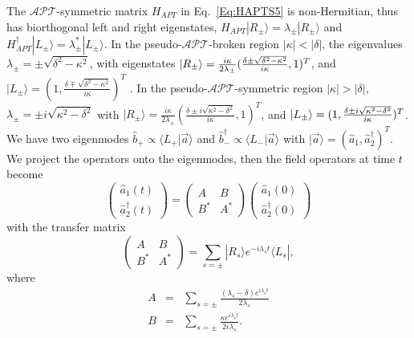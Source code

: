 \documentclass[twocolumn,prl,floatfix,citeautoscript,nofootinbib,superscriptaddress]{revtex4}
\begin{document}
\begin{widetext}
The $\mathcal{APT}$-symmetric matrix $H_{APT}$ in Eq.~\ref{Eq:HAPTS5} is
non-Hermitian, thus has biorthogonal left and right eigenstates, $%
H_{APT}|R_{\pm }\rangle =\lambda _{\pm }|R_{\pm }\rangle $ and $%
H_{APT}^{\dag }|L_{\pm }\rangle =\lambda _{\pm }^{\ast }|L_{\pm }\rangle $.
In the pseudo-$\mathcal{APT}$-broken region $|\kappa |<|\delta |$, the
eigenvalues $\lambda _{\pm }=\pm \sqrt{\delta ^{2}-\kappa ^{2}}$, with
eigenstates $|R_{\pm }\rangle =\frac{i\kappa }{2\lambda _{\pm }}(\frac{%
\delta \pm \sqrt{\delta ^{2}-\kappa ^{2}}}{i\kappa },1)^{T}$, and $|L_{\pm
}\rangle =(1,\frac{\delta \mp \sqrt{\delta ^{2}-\kappa ^{2}}}{i\kappa })^{T}$%
. In the pseudo-$\mathcal{APT}$-symmetric region $|\kappa |>|\delta |$, $%
\lambda _{\pm }=\pm i\sqrt{\kappa ^{2}-\delta ^{2}}$ with $|R_{\pm }\rangle =%
\frac{i\kappa }{2\lambda _{\pm }}(\frac{\delta \pm i\sqrt{\kappa ^{2}-\delta
^{2}}}{i\kappa },1)^{T}$, and $|L_{\pm }\rangle =(1,\frac{\delta \pm i\sqrt{%
\kappa ^{2}-\delta ^{2}}}{i\kappa })^{T} $. We have two eigenmodes $\hat{b}%
_{+}\propto \langle L_{+}|\vec{a}\rangle $ and $\hat{b}_{-}^{\dag }\propto
\langle L_{-}|\vec{a}\rangle $ with $|\vec{a}\rangle =(\hat{a}_{1},\hat{a}%
_{2}^{\dag })^{T}$. We project the operators onto the eigenmodes, then the
field operators at time $t$ become
\begin{equation}
\left(
\begin{array}{c}
\hat{a}_{1}(t) \\
\hat{a}_{2}^{\dag }(t)%
\end{array}%
\right) =\left(
\begin{array}{cc}
A & B \\
B^{\ast } & A^{\ast }%
\end{array}%
\right) \left(
\begin{array}{c}
\hat{a}_{1}(0) \\
\hat{a}_{2}^{\dag }(0)%
\end{array}%
\right)
\end{equation}%
with the transfer matrix
\begin{equation}
\left(
\begin{array}{cc}
A & B \\
B^{\ast } & A^{\ast }%
\end{array}%
\right) =\sum_{s=\pm }|R_{s}\rangle e^{-i\lambda _{s}t}\langle L_{s}|,
\end{equation}%
where
\begin{eqnarray}
A &=&\sum_{s=\pm }\frac{(\lambda _{s}-\delta )e^{i\lambda _{s}t}}{2\lambda
_{s}} \\
B &=&\sum_{s=\pm }\frac{\kappa e^{i\lambda _{s}t}}{2i\lambda _{s}}.
\end{eqnarray}


\end{widetext}
\end{document}
